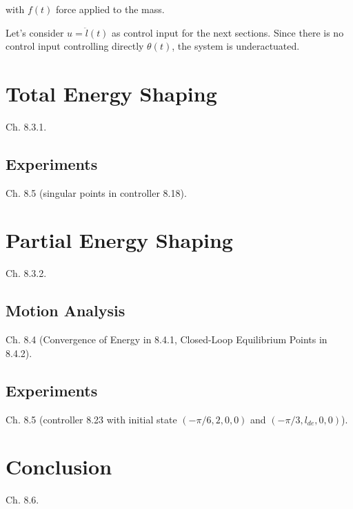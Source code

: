 \documentclass[a4paper]{article}
\begin{document}
\noindent with $f(t)$ force applied to the mass.

Let's consider $u = \ddot{l}(t)$ as control input for the next sections. Since 
there is no control input controlling directly $\theta(t)$, the system is
underactuated.

\section{Total Energy Shaping}
Ch. 8.3.1.

\subsection{Experiments}
Ch. 8.5 (singular points in controller 8.18).

\section{Partial Energy Shaping}
Ch. 8.3.2.

\subsection{Motion Analysis}
Ch. 8.4 (Convergence of Energy in 8.4.1, Closed-Loop Equilibrium Points in
8.4.2).

\subsection{Experiments}
Ch. 8.5 (controller 8.23 with initial state $(-\pi/6, 2, 0, 0)$ and
$(-\pi/3, l_{de}, 0, 0)$).

\section{Conclusion}
Ch. 8.6.


\clearpage







\end{document}
